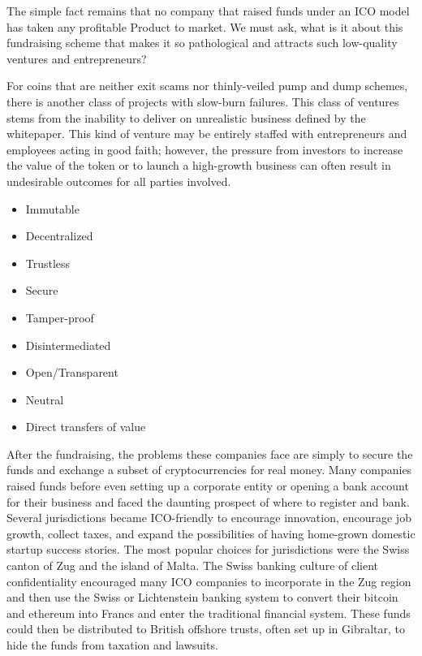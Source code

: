 The simple fact remains that no company that raised funds under an ICO model has
taken any profitable Product to market. We must ask, what is it about this
fundraising scheme that makes it so pathological and attracts such low-quality
ventures and entrepreneurs?

For coins that are neither exit scams nor thinly-veiled pump and dump schemes,
there is another class of projects with slow-burn failures. This class of
ventures stems from the inability to deliver on unrealistic business defined by
the whitepaper. This kind of venture may be entirely staffed with entrepreneurs
and employees acting in good faith; however, the pressure from investors to
increase the value of the token or to launch a high-growth business can often
result in undesirable outcomes for all parties involved.

\begin{itemize}
\item Immutable
\item Decentralized
\item Trustless
\item Secure
\item Tamper-proof
\item Disintermediated
\item Open/Transparent
\item Neutral
\item Direct transfers of value
\end{itemize}

After the fundraising, the problems these companies face are simply to secure
the funds and exchange a subset of cryptocurrencies for real money. Many
companies raised funds before even setting up a corporate entity or opening a
bank account for their business and faced the daunting prospect of where to
register and bank. Several jurisdictions became ICO-friendly to encourage
innovation, encourage job growth, collect taxes, and expand the possibilities of
having home-grown domestic startup success stories. The most popular choices for
jurisdictions were the Swiss canton of Zug and the island of Malta. The Swiss
banking culture of client confidentiality encouraged many ICO companies to
incorporate in the Zug region and then use the Swiss or Lichtenstein banking
system to convert their bitcoin and ethereum into Francs and enter the
traditional financial system. These funds could then be distributed to British
offshore trusts, often set up in Gibraltar, to hide the funds from taxation and
lawsuits.

